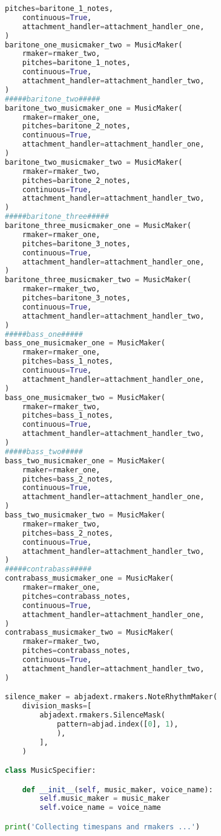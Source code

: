 \begin{lstlisting}[language=Python, caption=Invocation Source Code]
    pitches=baritone_1_notes,
    continuous=True,
    attachment_handler=attachment_handler_one,
)
baritone_one_musicmaker_two = MusicMaker(
    rmaker=rmaker_two,
    pitches=baritone_1_notes,
    continuous=True,
    attachment_handler=attachment_handler_two,
)
#####baritone_two#####
baritone_two_musicmaker_one = MusicMaker(
    rmaker=rmaker_one,
    pitches=baritone_2_notes,
    continuous=True,
    attachment_handler=attachment_handler_one,
)
baritone_two_musicmaker_two = MusicMaker(
    rmaker=rmaker_two,
    pitches=baritone_2_notes,
    continuous=True,
    attachment_handler=attachment_handler_two,
)
#####baritone_three#####
baritone_three_musicmaker_one = MusicMaker(
    rmaker=rmaker_one,
    pitches=baritone_3_notes,
    continuous=True,
    attachment_handler=attachment_handler_one,
)
baritone_three_musicmaker_two = MusicMaker(
    rmaker=rmaker_two,
    pitches=baritone_3_notes,
    continuous=True,
    attachment_handler=attachment_handler_two,
)
#####bass_one#####
bass_one_musicmaker_one = MusicMaker(
    rmaker=rmaker_one,
    pitches=bass_1_notes,
    continuous=True,
    attachment_handler=attachment_handler_one,
)
bass_one_musicmaker_two = MusicMaker(
    rmaker=rmaker_two,
    pitches=bass_1_notes,
    continuous=True,
    attachment_handler=attachment_handler_two,
)
#####bass_two#####
bass_two_musicmaker_one = MusicMaker(
    rmaker=rmaker_one,
    pitches=bass_2_notes,
    continuous=True,
    attachment_handler=attachment_handler_one,
)
bass_two_musicmaker_two = MusicMaker(
    rmaker=rmaker_two,
    pitches=bass_2_notes,
    continuous=True,
    attachment_handler=attachment_handler_two,
)
#####contrabass#####
contrabass_musicmaker_one = MusicMaker(
    rmaker=rmaker_one,
    pitches=contrabass_notes,
    continuous=True,
    attachment_handler=attachment_handler_one,
)
contrabass_musicmaker_two = MusicMaker(
    rmaker=rmaker_two,
    pitches=contrabass_notes,
    continuous=True,
    attachment_handler=attachment_handler_two,
)

silence_maker = abjadext.rmakers.NoteRhythmMaker(
    division_masks=[
        abjadext.rmakers.SilenceMask(
            pattern=abjad.index([0], 1),
            ),
        ],
    )

class MusicSpecifier:

    def __init__(self, music_maker, voice_name):
        self.music_maker = music_maker
        self.voice_name = voice_name

print('Collecting timespans and rmakers ...')


\end{lstlisting}
